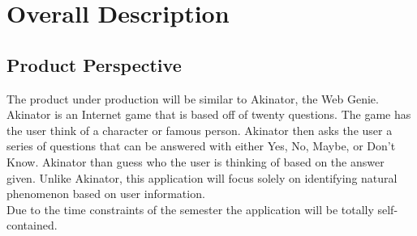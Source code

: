\documentclass[]{article}
\begin{document}


\section{Overall Description}
\label{sec:overall_description}


\subsection{Product Perspective}
\label{sub:product_perspective}
The product under production will be similar to Akinator, the Web Genie. Akinator is an Internet game that is based off of twenty questions. The game has the user think of a character or famous person. Akinator then asks the user a series of questions that can be answered with either Yes, No, Maybe, or Don't Know. Akinator than guess who the user is thinking of based on the answer given.  Unlike Akinator, this application will focus solely on identifying natural phenomenon based on user information.\\
Due to the time constraints of the semester the application will be totally self-contained. 
\end{document}
